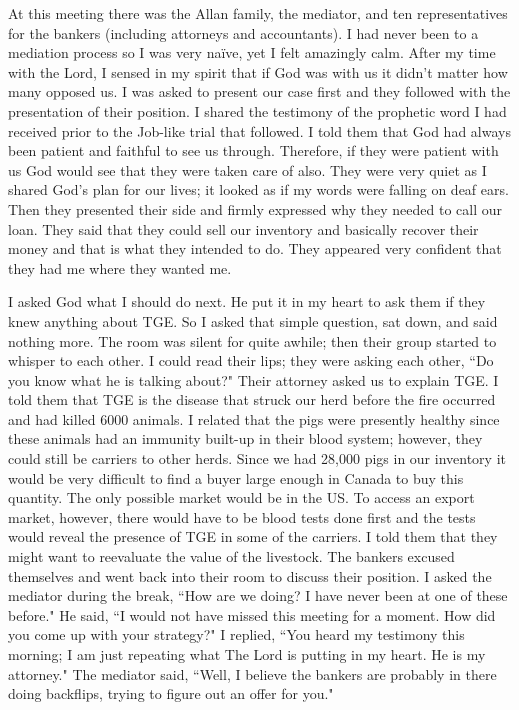 \documentclass[oneside]{book}
\begin{document}
At this meeting there was the Allan family, the mediator, and ten representatives for the bankers (including attorneys and accountants). I had never been to a mediation process so I was very naïve, yet I felt amazingly calm. After my time with the Lord, I sensed in my spirit that if God was with us it didn't matter how many opposed us. I was asked to present our case first and they followed with the presentation of their position. I shared the testimony of the prophetic word I had received prior to the Job-like trial that followed. I told them that God had always been patient and faithful to see us through. Therefore, if they were patient with us God would see that they were taken care of also. They were very quiet as I shared God's plan for our lives; it looked as if my words were falling on deaf ears. Then they presented their side and firmly expressed why they needed to call our loan. They said that they could sell our inventory and basically recover their money and that is what they intended to do. They appeared very confident that they had me where they wanted me.

I asked God what I should do next. He put it in my heart to ask them if they knew anything about TGE. So I asked that simple question, sat down, and said nothing more. The room was silent for quite awhile; then their group started to whisper to each other. I could read their lips; they were asking each other, ``Do you know what he is talking about?" Their attorney asked us to explain TGE. I told them that TGE is the disease that struck our herd before the fire occurred and had killed 6000 animals. I related that the pigs were presently healthy since these animals had an immunity built-up in their blood system; however, they could still be carriers to other herds. Since we had 28,000 pigs in our inventory it would be very difficult to find a buyer large enough in Canada to buy this quantity. The only possible market would be in the US. To access an export market, however, there would have to be blood tests done first and the tests would reveal the presence of TGE in some of the carriers. I told them that they might want to reevaluate the value of the livestock. The bankers excused themselves and went back into their room to discuss their position. I asked the mediator during the break, ``How are we doing? I have never been at one of these before."  He said, ``I would not have missed this meeting for a moment. How did you come up with your strategy?" I replied, ``You heard my testimony this morning; I am just repeating what The Lord is putting in my heart. He is my attorney." The mediator said, ``Well, I believe the bankers are probably in there doing backflips, trying to figure out an offer for you."
\end{document}
